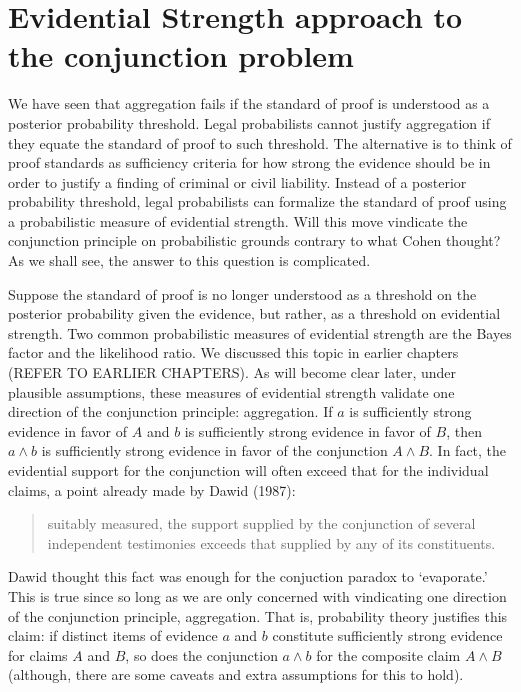 \documentclass[
  10pt,
  dvipsnames,enabledeprecatedfontcommands]{scrartcl}
\begin{document}
\hypertarget{evidential-strength-approach-to-the-conjunction-problem}{%
\section{Evidential Strength approach to the conjunction
problem}\label{evidential-strength-approach-to-the-conjunction-problem}}

We have seen that aggregation fails if the standard of proof is
understood as a posterior probability threshold. Legal probabilists
cannot justify aggregation if they equate the standard of proof to such
threshold. The alternative is to think of proof standards as sufficiency
criteria for how strong the evidence should be in order to justify a
finding of criminal or civil liability. Instead of a posterior
probability threshold, legal probabilists can formalize the standard of
proof using a probabilistic measure of evidential strength. Will this
move vindicate the conjunction principle on probabilistic grounds
contrary to what Cohen thought? As we shall see, the answer to this
question is complicated.

Suppose the standard of proof is no longer understood as a threshold on
the posterior probability given the evidence, but rather, as a threshold
on evidential strength. Two common probabilistic measures of evidential
strength are the Bayes factor and the likelihood ratio. We discussed
this topic in earlier chapters (REFER TO EARLIER CHAPTERS). As will
become clear later, under plausible assumptions, these measures of
evidential strength validate one direction of the conjunction principle:
aggregation. If \(a\) is sufficiently strong evidence in favor of \(A\)
and \(b\) is sufficiently strong evidence in favor of \(B\), then
\(a\wedge b\) is sufficiently strong evidence in favor of the
conjunction \(A \wedge B\). In fact, the evidential support for the
conjunction will often exceed that for the individual claims, a point
already made by Dawid (1987):

\begin{quote} suitably measured, the support supplied by the conjunction of several independent testimonies exceeds that supplied by any of its constituents.
 \end{quote}

\noindent Dawid thought this fact was enough for the conjuction paradox
to `evaporate.' This is true since so long as we are only concerned with
vindicating one direction of the conjunction principle, aggregation.
That is, probability theory justifies this claim: if distinct items of
evidence \(a\) and \(b\) constitute sufficiently strong evidence for
claims \(A\) and \(B\), so does the conjunction \(a\wedge b\) for the
composite claim \(A\wedge B\) (although, there are some caveats and
extra assumptions for this to hold).
\end{document}
